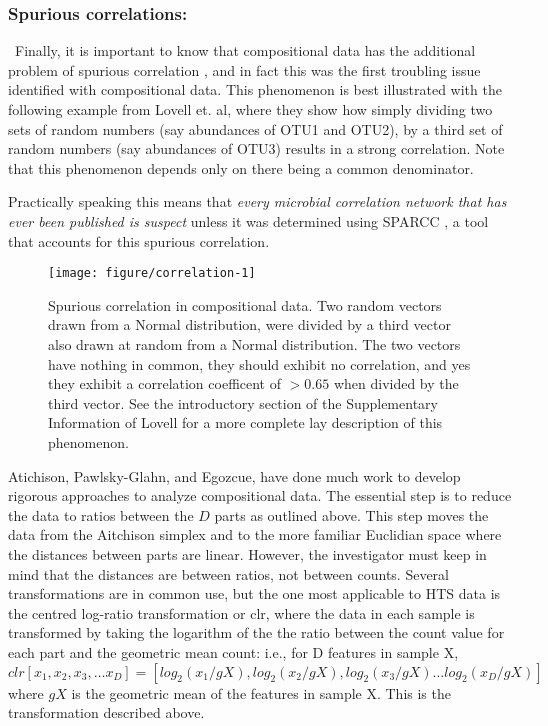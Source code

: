 \documentclass[11pt]{article}\usepackage[]{graphicx}\usepackage[]{color}
\makeatletter
\def\maxwidth{ %
  \ifdim\Gin@nat@width>\linewidth
    \linewidth
  \else
    \Gin@nat@width
  \fi
}
\newenvironment{knitrout}{}{} %
\makeatother
\begin{document}
\subsubsection{Spurious correlations:}~Finally, it is important to know that compositional data has the additional problem of  spurious correlation \cite{Pearson:1896}, and in fact this was the first troubling issue identified with compositional data. This phenomenon is best illustrated with  the following example from Lovell et. al\cite{Lovell:2015aa}, where they show how simply dividing two sets of random numbers (say abundances of OTU1 and OTU2), by a third set of random numbers (say abundances of OTU3) results in a strong correlation. Note that this phenomenon depends only on there being a common denominator.

Practically speaking this means that \emph{every microbial correlation network that has ever been published is suspect} unless it was determined using SPARCC \cite{Friedman:2012}, a tool that accounts for this spurious correlation.

\begin{figure}
\begin{center}

\begin{knitrout}
\color{fgcolor}
\texttt{[image: figure/correlation-1]} 

\end{knitrout}
\caption{Spurious correlation in compositional data. Two random vectors drawn from a Normal distribution, were divided by a third vector also drawn at random from a Normal distribution. The two vectors have nothing in common, they should exhibit  no correlation, and yes they exhibit a correlation coefficent of $>0.65$ when divided by the third vector. See the introductory section of the Supplementary Information of Lovell\cite{Lovell:2015aa} for a more complete lay description of this phenomenon.  }
\label{correlation}
\end{center}
\end{figure}


Atichison\cite{Aitchison:1986}, Pawlsky-Glahn\cite{Pawlowsky-Glahn:2006}, and Egozcue\cite{egozcue2005}, have done much work to develop rigorous approaches to analyze compositional data\cite{pawlowsky2011compositional}. The essential step is to reduce the data to ratios between the $D$ parts as outlined above. This step moves the data from the Aitchison simplex and to the more familiar Euclidian space where the distances between parts are linear. However, the investigator must keep in mind that the distances are between ratios, not between counts. Several transformations are in common use, but the one most applicable to HTS data is the centred log-ratio transformation or clr, where the data in each sample is transformed by taking the logarithm of the the ratio between the count value for each part and the geometric mean count: i.e., for D features in sample X, $clr [x_1, x_2, x_3, \ldots x_D] = [log_2(x_1/gX), log_2(x_2/gX), log_2(x_3/gX) \ldots log_2(x_D/gX)]$ where $gX$ is the geometric mean of the features in sample X. This is the transformation described above.
\end{document}
